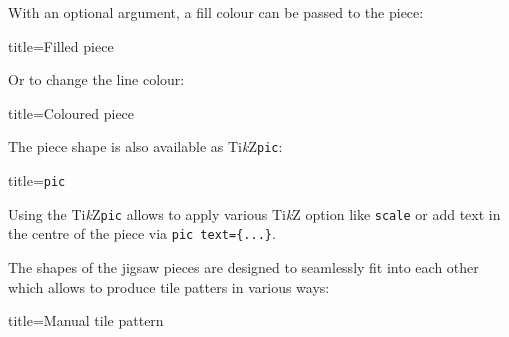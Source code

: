 \documentclass[parskip=half]{scrartcl}
\newcommand{\TikZ}{Ti\emph{k}Z\xspace}
\begin{document}
With an optional argument, a fill colour can be passed to the piece:

\begin{tcblisting}{title={Filled piece}}
\end{tcblisting}

Or to change the line colour:

\begin{tcblisting}{title={Coloured piece}}
\end{tcblisting}

The piece shape is also available as \TikZ \verb|pic|:

\begin{tcblisting}{title={\texttt{pic}}}
\end{tcblisting}

Using the \TikZ \verb|pic| allows to apply various \TikZ option like \verb|scale| or add text in the centre of the piece via \verb|pic text={...}|.

The shapes of the jigsaw pieces are designed to seamlessly fit into each other which allows to produce tile patters in various ways:

\begin{tcblisting}{title={Manual tile pattern}}
\end{tcblisting}
\end{document}
